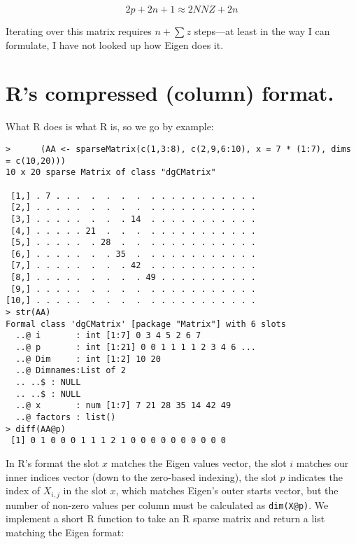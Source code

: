 \begin{equation}
2p + 2n + 1 \approx 2NNZ + 2n
\end{equation}

Iterating over this matrix requires $n +\sum z$ steps---at least in the
way I can formulate, I have not looked up how Eigen does it.

\section{R's compressed (column) format.}

What R does is what R is, so we go by example:

\begin{verbatim}
>      (AA <- sparseMatrix(c(1,3:8), c(2,9,6:10), x = 7 * (1:7), dims = c(10,20)))
10 x 20 sparse Matrix of class "dgCMatrix"
                                                  
 [1,] . 7 . . .  .  .  .  .  . . . . . . . . . . .
 [2,] . . . . .  .  .  .  .  . . . . . . . . . . .
 [3,] . . . . .  .  .  . 14  . . . . . . . . . . .
 [4,] . . . . . 21  .  .  .  . . . . . . . . . . .
 [5,] . . . . .  . 28  .  .  . . . . . . . . . . .
 [6,] . . . . .  .  . 35  .  . . . . . . . . . . .
 [7,] . . . . .  .  .  . 42  . . . . . . . . . . .
 [8,] . . . . .  .  .  .  . 49 . . . . . . . . . .
 [9,] . . . . .  .  .  .  .  . . . . . . . . . . .
[10,] . . . . .  .  .  .  .  . . . . . . . . . . .
> str(AA)
Formal class 'dgCMatrix' [package "Matrix"] with 6 slots
  ..@ i       : int [1:7] 0 3 4 5 2 6 7
  ..@ p       : int [1:21] 0 0 1 1 1 1 2 3 4 6 ...
  ..@ Dim     : int [1:2] 10 20
  ..@ Dimnames:List of 2
  .. ..$ : NULL
  .. ..$ : NULL
  ..@ x       : num [1:7] 7 21 28 35 14 42 49
  ..@ factors : list()
> diff(AA@p)
 [1] 0 1 0 0 0 1 1 1 2 1 0 0 0 0 0 0 0 0 0 0

\end{verbatim}

In R's format the slot $x$ matches the Eigen values vector, the slot $i$ matches 
our inner indices vector (down to the zero-based indexing), the slot $p$ indicates 
the index of $X_{i,j}$ in the slot $x$, which matches Eigen's outer starts vector,
but the number of non-zero values per column must be calculated as \verb?dim(X@p)?.
We implement a short R function to take an R sparse matrix and return a list matching the
Eigen format:

\begin{verbatim}

\end{verbatim}

